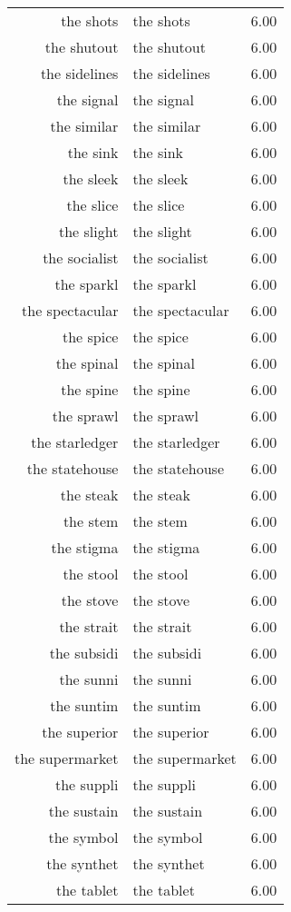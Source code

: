 \begin{table}[ht]
\begin{tabular}{rlr}
  the shots & the shots & 6.00 \\ 
  the shutout & the shutout & 6.00 \\ 
  the sidelines & the sidelines & 6.00 \\ 
  the signal & the signal & 6.00 \\ 
  the similar & the similar & 6.00 \\ 
  the sink & the sink & 6.00 \\ 
  the sleek & the sleek & 6.00 \\ 
  the slice & the slice & 6.00 \\ 
  the slight & the slight & 6.00 \\ 
  the socialist & the socialist & 6.00 \\ 
  the sparkl & the sparkl & 6.00 \\ 
  the spectacular & the spectacular & 6.00 \\ 
  the spice & the spice & 6.00 \\ 
  the spinal & the spinal & 6.00 \\ 
  the spine & the spine & 6.00 \\ 
  the sprawl & the sprawl & 6.00 \\ 
  the starledger & the starledger & 6.00 \\ 
  the statehouse & the statehouse & 6.00 \\ 
  the steak & the steak & 6.00 \\ 
  the stem & the stem & 6.00 \\ 
  the stigma & the stigma & 6.00 \\ 
  the stool & the stool & 6.00 \\ 
  the stove & the stove & 6.00 \\ 
  the strait & the strait & 6.00 \\ 
  the subsidi & the subsidi & 6.00 \\ 
  the sunni & the sunni & 6.00 \\ 
  the suntim & the suntim & 6.00 \\ 
  the superior & the superior & 6.00 \\ 
  the supermarket & the supermarket & 6.00 \\ 
  the suppli & the suppli & 6.00 \\ 
  the sustain & the sustain & 6.00 \\ 
  the symbol & the symbol & 6.00 \\ 
  the synthet & the synthet & 6.00 \\ 
  the tablet & the tablet & 6.00 \\ 

\end{tabular}
\end{table}
